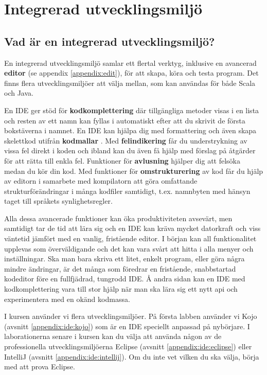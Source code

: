 
\chapter{Integrerad utvecklingsmiljö}\label{appendix:ide}

\section{Vad är en integrerad utvecklingsmiljö?}

En integrerad utvecklingsmiljö  samlar ett flertal verktyg, inklusive en avancerad \textbf{editor} (se appendix \ref{appendix:edit}), för att skapa, köra och testa program. Det finns flera utvecklingsmiljöer att välja mellan, som kan användas för både Scala och Java.

En IDE ger stöd för \textbf{kodkomplettering}  där tillgängliga metoder visas i en lista och resten av ett namn kan fyllas i automatiskt efter att du skrivit de första bokstäverna i namnet. En IDE kan hjälpa dig med formattering och även skapa skelettkod utifrån \textbf{kodmallar} . Med \textbf{felindikering}  får du understrykning av vissa fel direkt i koden och ibland kan du även få hjälp med förslag på åtgärder för att rätta till enkla fel. Funktioner för \textbf{avlusning}  hjälper dig att felsöka medan du kör din kod. Med funktioner för \textbf{omstrukturering}  av kod får du hjälp av editorn i samarbete med kompilatorn att göra omfattande strukturförändringar i många kodfiler samtidigt, t.ex. namnbyten med hänsyn taget till språkets synlighetsregler.  

Alla dessa avancerade funktioner kan öka produktiviteten avsevärt, men samtidigt tar de tid att lära sig och en IDE kan kräva mycket datorkraft och viss väntetid jämfört med en vanlig, fristående editor. I början kan all funktionalitet upplevas som överväldigande och det kan vara svårt att hitta i alla menyer och inställningar. Ska man bara skriva ett litet, enkelt program, eller göra några mindre ändringar, är det många som föredrar en fristående, snabbstartad kodeditor före en fullfjädrad, tungrodd IDE. Å andra sidan kan en IDE med kodkomplettering vara till stor hjälp när man ska lära sig ett nytt api och experimentera med en okänd kodmassa.

I kursen använder vi flera utvecklingsmiljöer. På första labben använder vi Kojo (avsnitt \ref{appendix:ide:kojo}) som är en IDE speciellt anpassad på nybörjare. I laborationerna senare i kursen kan du välja att använda någon av de professionella utvecklingsmiljöerna Eclipse (avsnitt \ref{appendix:ide:eclipse}) eller IntelliJ (avsnitt \ref{appendix:ide:intellij}). Om du inte vet vilken du ska välja, börja med att prova Eclipse.



